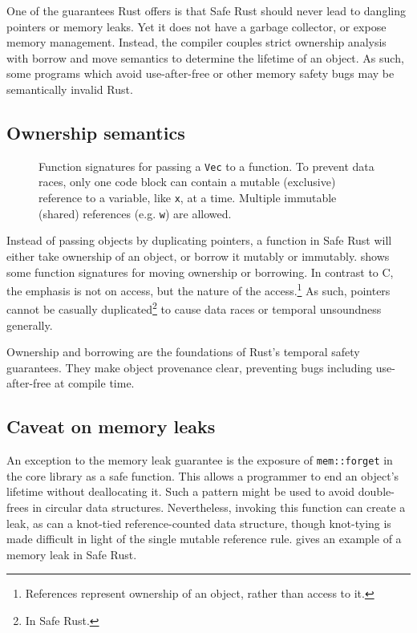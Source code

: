 \documentclass[dissertation.tex]{subfiles}
\begin{document}
One of the guarantees Rust offers is that Safe Rust should never lead to
dangling pointers or memory leaks.
Yet it does not have a garbage collector, or expose memory management.
Instead, the compiler couples strict ownership analysis with borrow and
move semantics to determine the lifetime of an object.
As such, some programs which avoid use-after-free or other memory safety
bugs may be semantically invalid Rust.

\subsection{Ownership semantics}

\begin{figure}[ht]
    
    \caption{
        Function signatures for passing a \texttt{Vec} to a function.
        To prevent data races, only one code block can contain a mutable
        (exclusive) reference to a variable, like \texttt{x}, at a time.
        Multiple immutable (shared) references (e.g. \texttt{w}) are
        allowed.
    }
    \label{lst:rust-ownership}
\end{figure}

Instead of passing objects by duplicating pointers, a function in Safe
Rust will either take ownership of an object, or borrow it mutably or
immutably.
 shows some function signatures for
moving ownership or borrowing.
In contrast to C, the emphasis is not on access, but the nature of the
access.\footnote{References represent ownership of an object, rather
than access to it.}
As such, pointers cannot be casually duplicated\footnote{In Safe Rust.}
to cause data races or temporal unsoundness generally.

Ownership and borrowing are the foundations of Rust's temporal safety
guarantees.
They make object provenance clear, preventing bugs including
use-after-free at compile time.

\subsection{Caveat on memory leaks}
An exception to the memory leak guarantee is the exposure of
\texttt{mem::forget} in the core library as a safe function.
This allows a programmer to end an object's lifetime without
deallocating it.
Such a pattern might be used to avoid double-frees in circular data
structures.
Nevertheless, invoking this function can create a leak, as can a
knot-tied reference-counted data structure, though knot-tying is made
difficult in light of the single mutable reference rule.
 gives an example of a memory leak in
Safe Rust.
\end{document}
